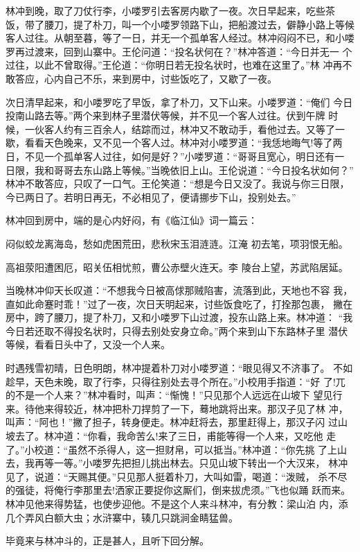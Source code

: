 林冲到晚，取了刀仗行李，小喽罗引去客房内歇了一夜。次日早起来，吃些茶
饭，带了腰刀，提了朴刀，叫一个小喽罗领路下山，把船渡过去，僻静小路上等候
客人过往。从朝至暮，等了一日，并无一个孤单客人经过。林冲闷闷不已，和小喽
罗再过渡来，回到山寨中。王伦问道：“投名状何在？”林冲答道：“今日并无一
个过往，以此不曾取得。”王伦道：“你明日若无投名状时，也难在这里了。”林
冲再不敢答应，心内自己不乐，来到房中，讨些饭吃了，又歇了一夜。

次日清早起来，和小喽罗吃了早饭，拿了朴刀，又下山来。小喽罗道：“俺们
今日投南山路去等。”两个来到林子里潜伏等候，并不见一个客人过往。伏到午牌
时候，一伙客人约有三百余人，结踪而过，林冲又不敢动手，看他过去。又等了一
歇，看看天色晚来，又不见一个客人过。林冲对小喽罗道：“我恁地晦气!等了两
日，不见一个孤单客人过往，如何是好？”小喽罗道：“哥哥且宽心，明日还有一
日限，我和哥哥去东山路上等候。”当晚依旧上山。王伦说道：“今日投名状如何？”
林冲不敢答应，只叹了一口气。王伦笑道：“想是今日又没了。我说与你三日限，
今已两日了。若明日再无，不必相见了，便请挪步下山，投别处去。”

林冲回到房中，端的是心内好闷，有《临江仙》词一篇云：

闷似蛟龙离海岛，愁如虎困荒田，悲秋宋玉泪涟涟。江淹
初去笔，项羽恨无船。

高祖荥阳遭困厄，昭关伍相忧煎，曹公赤壁火连天。李
陵台上望，苏武陷居延。

当晚林冲仰天长叹道：“不想我今日被高俅那贼陷害，流落到此，天地也不容
我，直如此命蹇时乖！”过了一夜，次日天明起来，讨些饭食吃了，打拴那包裹，
撇在房中，跨了腰刀，提了朴刀，又和小喽罗下山过渡，投东山路上来。林冲道：
“我今日若还取不得投名状时，只得去别处安身立命。”两个来到山下东路林子里
潜伏等候，看看日头中了，又没一个人来。

时遇残雪初晴，日色明朗，林冲提着朴刀对小喽罗道：“眼见得又不济事了。
不如趁早，天色未晚，取了行李，只得往别处去寻个所在。”小校用手指道：“好
了!兀的不是一个人来？”林冲看时，叫声：“惭愧！”只见那个人远远在山坡下
望见行来。待他来得较近，林冲把朴刀捍剪了一下，蓦地跳将出来。那汉子见了林
冲，叫声：“阿也！”撇了担子，转身便走。林冲赶将去，那里赶得上，那汉子闪
过山坡去了。林冲道：“你看，我命苦么!来了三日，甫能等得一个人来，又吃他
走了。”小校道：“虽然不杀得人，这一担财帛，可以抵当。”林冲道：“你先挑
了上山去，我再等一等。”小喽罗先把担儿挑出林去。只见山坡下转出一个大汉来，
林冲见了，说道：“天赐其便。”只见那人挺着朴刀，大叫如雷，喝道：“泼贼，
杀不尽的强徒，将俺行李那里去!洒家正要捉你这厮们，倒来拔虎须。”飞也似踊
跃而来。林冲见他来得势猛，也使步迎他。不是这个人来斗林冲，有分教：梁山泊
内，添几个弄风白额大虫；水浒寨中，辏几只跳涧金睛猛兽。

毕竟来与林冲斗的，正是甚人，且听下回分解。